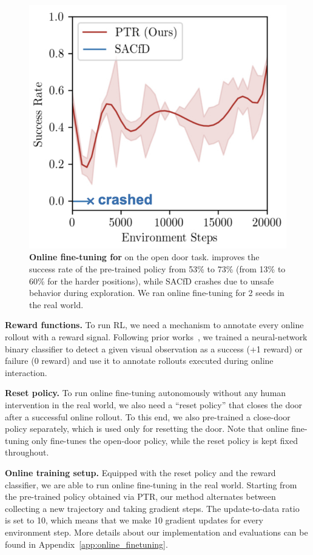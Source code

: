 \begin{figure}[t]
\centering
\includegraphics[width=0.6\linewidth]{chapters/ptr/online-open-door.jpeg}
\vspace{-0.24cm}
\caption{\footnotesize{\label{fig:online_door} \textbf{Online fine-tuning for \ptrmethodname} on the open door task. \ptrmethodname improves the success rate of the pre-trained policy from 53\% to 73\% (from 13\% to 60\% for the harder positions), while SACfD crashes due to unsafe behavior during exploration. We ran \ptrmethodname online fine-tuning for 2 seeds in the real world.}}
\vspace{-0.6cm}
\end{figure}

\textbf{Reward functions.} To run RL, we need a mechanism to annotate every online rollout with a reward signal. Following prior works~\citep{singh2019, kalashnikov2021mt}, we trained a neural-network binary classifier to detect a given visual observation as a success (+1 reward) or failure (0 reward) and use it to annotate rollouts executed during online interaction. 

\textbf{Reset policy.} To run online fine-tuning autonomously without any human intervention in the real world, we also need a ``reset policy'' that closes the door after a successful online rollout. To this end, we also pre-trained a close-door policy separately, which is used only for resetting the door. Note that online fine-tuning only fine-tunes the open-door policy, while the reset policy is kept fixed throughout.


\textbf{Online training setup.} Equipped with the reset policy and the reward classifier, we are able to run online fine-tuning in the real world. Starting from the pre-trained policy obtained via PTR, our method alternates between collecting a new trajectory and taking gradient steps. The update-to-data ratio~\citep{2021arXiv210105982C} is set to 10, which means that we  make 10 gradient updates for every environment step. More details about our implementation and evaluations can be found in Appendix~\ref{app:online_finetuning}.


